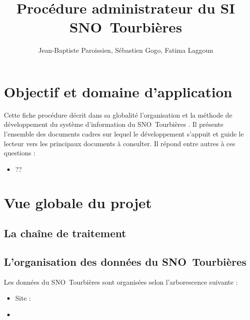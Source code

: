 \documentclass[]{article}
\title{Procédure administrateur du SI SNO~Tourbières}
\author{Jean-Baptiste Paroissien, Sébastien Gogo, Fatima Laggoun}
\newcommand{\SNOT}{{SNO~Tourbières }}
\begin{document}
\maketitle
\tableofcontents

\section{Objectif et domaine d'application}

Cette fiche procédure décrit dans sa globalité l'organisation et la méthode de développement du système d'information du \SNOT. Il présente l'ensemble des documents cadres sur lequel le développement s'appuit et guide le lecteur vers les principaux documents à consulter. Il répond entre autres à ces questions :

\begin{itemize}
  \item ??
\end{itemize}

\section{Vue globale du projet}

\subsection{La chaîne de traitement}

\subsection{L'organisation des données du \SNOT}

Les données du \SNOT sont organisées selon l'arborescence suivante : 
\begin{itemize}
	\item Site :
	\item 
\end{itemize}
\end{document}
